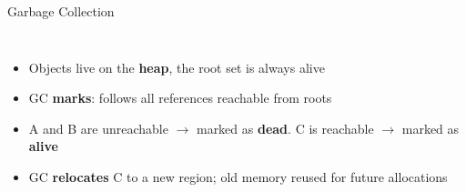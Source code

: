 \documentclass[aspectratio=169]{beamer}
\begin{document}
\begin{frame}{Garbage Collection}
\begin{columns}[T]
        \small
        \begin{itemize}
            \item<1-> Objects live on the \textbf{heap}, the root set is always alive
            \item<2-> GC \textbf{marks}: follows all references reachable from roots
            \item<3-> \textcolor{codered}{A and B} are unreachable $\to$ marked as \textbf{dead}.
                      \textcolor{alivegrn}{C} is reachable $\to$ marked as \textbf{alive}
            \item<4-> GC \textbf{relocates} C to a new region; old memory reused for future allocations
        \end{itemize}
    \end{columns}
\end{frame}
\end{document}
